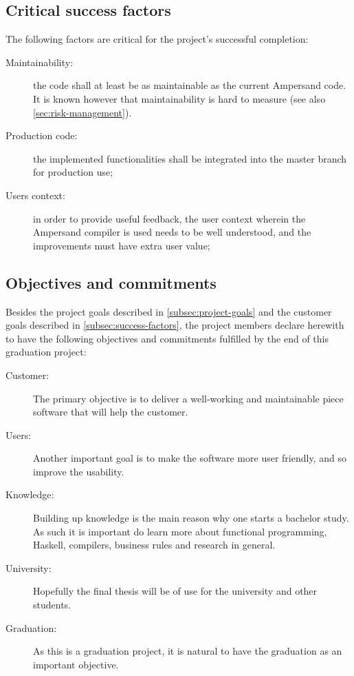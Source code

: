 \subsection{Critical success factors}
\label{subsec:success-factors}
The following factors are critical for the project's successful completion:
\begin{description}
	\item[Maintainability:] the code shall at least be as maintainable as the current Ampersand code.
		It is known however that maintainability is hard to measure (see also \autoref{sec:risk-management}).
	\item[Production code:] the implemented functionalities shall be integrated into the master branch for production use;
	\item[Users context:] in order to provide useful feedback, the user context wherein the Ampersand compiler is used needs to be well understood, and the improvements must have extra user value;
\end{description}

\subsection{Objectives and commitments}
Besides the project goals described in \autoref{subsec:project-goals} and the customer goals described in \autoref{subsec:success-factors}, the project members declare herewith to have the following objectives and commitments fulfilled by the end of this graduation project:
\begin{description}
	\item[Customer:] The primary objective is to deliver a well-working and maintainable piece software that will help the customer.
	\item[Users:] Another important goal is to make the software more user friendly, and so improve the usability.
	\item[Knowledge:] Building up knowledge is the main reason why one starts a bachelor study.
		As such it is important do learn more about functional programming, Haskell, compilers, business rules and research in general.
	\item[University:] Hopefully the final thesis will be of use for the university and other students.
	\item[Graduation:] As this is a graduation project, it is natural to have the graduation as an important objective.
\end{description}
